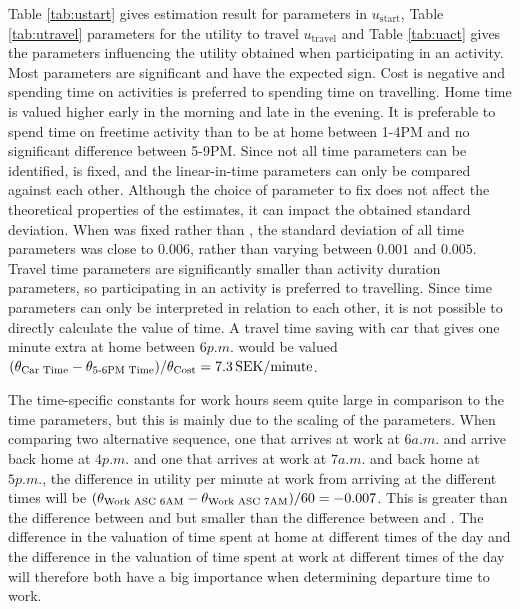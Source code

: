 Table \ref{tab:ustart} gives estimation result for parameters in $u_\text{start}$, Table \ref{tab:utravel} parameters for the utility to travel $u_\text{travel}$ and  Table \ref{tab:uact} gives the parameters influencing the utility obtained when participating in an activity. Most parameters are significant and have the expected sign. Cost is negative and spending time on activities is preferred to spending time on travelling. Home time is valued higher early in the morning and late in the evening. It is preferable to spend time on freetime activity than to be at home between 1-4PM and no significant difference between 5-9PM. Since not all time parameters can be identified,  is fixed, and the linear-in-time parameters can only be compared against each other. Although the choice of parameter to fix does not affect the theoretical properties of the estimates, it can impact the obtained standard deviation. When  was fixed rather than , the standard deviation of all time parameters was close to $0.006$, rather than varying between $0.001$ and $0.005$. Travel time parameters are significantly smaller than activity duration parameters, so participating in an activity is preferred to travelling. Since time parameters can only be interpreted in relation to each other, it is not possible to directly calculate the value of time. A travel time saving with car that gives one minute extra at home between $6\unit{p.m.}$ would be valued $({\theta_{\text{Car Time}}} - {\theta_{\text{5-6PM Time}}})/{\theta_{\text{Cost}}} = 7.3\, \mathrm{SEK/minute}$.

The time-specific constants for work hours seem quite large in comparison to the time parameters, but this is mainly due to the scaling of the parameters. When comparing two alternative sequence, one that arrives at work at $6\unit{a.m.}$ and arrive back home at $4\unit{p.m.}$ and one that arrives at work at $7\unit{a.m.}$ and back home at $5\unit{p.m.}$, the difference in utility per minute at work from arriving at the different times will be $({\theta_{\text{Work ASC 6AM}}}-{\theta_{\text{Work ASC 7AM}}})/60 = -0.007$. This is greater than the difference between  and  but smaller than the difference between  and . The difference in the valuation of time spent at home at different times of the day and the difference in the valuation of time spent at work at different times of the day will therefore both have a big importance when determining departure time to work.

